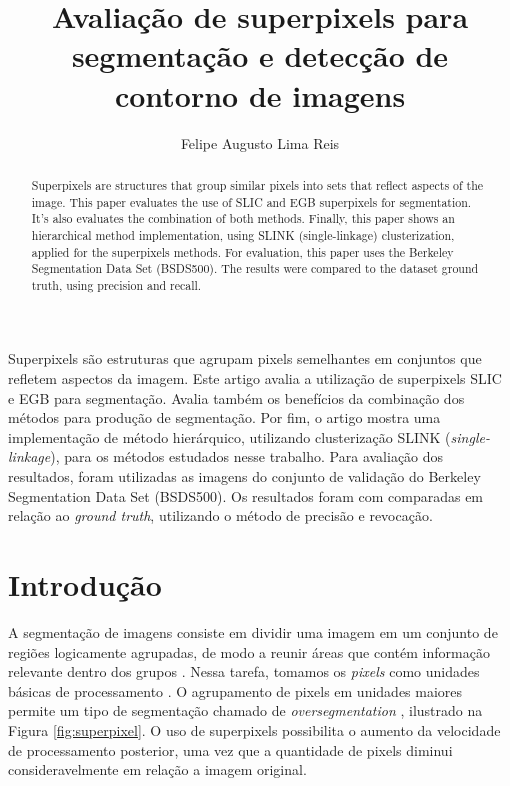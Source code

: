 \title{Avaliação de superpixels para segmentação e detecção de contorno de imagens}
\author{Felipe Augusto Lima Reis\inst{1}}
\begin{document}
 

\maketitle

\begin{abstract}
  Superpixels are structures that group similar pixels into sets that reflect aspects of the image. This paper evaluates the use of SLIC and EGB superpixels for segmentation. It's also evaluates the combination of both methods. Finally, this paper shows an hierarchical method implementation, using SLINK (single-linkage) clusterization, applied for the superpixels methods. For evaluation, this paper uses the Berkeley Segmentation Data Set (BSDS500). The results were compared to the dataset ground truth, using precision and recall.
\end{abstract}
     
\begin{resumo} 
  Superpixels são estruturas que agrupam pixels semelhantes em conjuntos que refletem aspectos da imagem. Este artigo avalia a utilização de superpixels SLIC e EGB para segmentação. Avalia também os benefícios da combinação dos métodos para produção de segmentação. Por fim, o artigo mostra uma implementação de método hierárquico, utilizando clusterização SLINK (\textit{single-linkage}), para os métodos estudados nesse trabalho. Para avaliação dos resultados, foram utilizadas as imagens do conjunto de validação do Berkeley Segmentation Data Set (BSDS500). Os resultados foram com comparadas em relação ao \textit{ground truth}, utilizando o método de precisão e revocação.
\end{resumo}


\section{Introdução} \label{sec:introducao}

A segmentação de imagens consiste em dividir uma imagem em um conjunto de regiões logicamente agrupadas, de modo a reunir áreas que contém informação relevante dentro dos grupos \cite{DOMINGUEZ}. Nessa tarefa, tomamos os \textit{pixels} como unidades básicas de processamento \cite{WANG201728}. O agrupamento de pixels em unidades maiores permite um tipo de segmentação chamado de \textit{oversegmentation} \cite{WANG201728}, ilustrado na Figura \ref{fig:superpixel}. O uso de superpixels possibilita o aumento da velocidade de processamento posterior, uma vez que a quantidade de pixels diminui consideravelmente em relação a imagem original.
\end{document}
